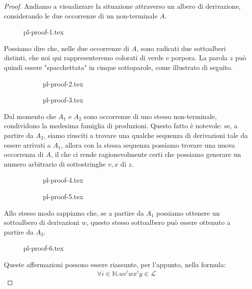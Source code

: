 \documentclass[class=book, crop=false, oneside, 12pt]{standalone}
\begin{document}
\begin{proof}
  Andiamo a visualizzare la situazione attraverso un albero di derivazione, considerando le due occorrenze di un non-terminale \(A\).
  \begin{figure}[H]
    \centering
    {pl-proof-1.tex}
  \end{figure}
  Possiamo dire che, nelle due occorrenze di \(A\), sono radicati due sottoalberi distinti, che noi qui rappresenteremo colorati di verde e porpora. La parola \(z\) può quindi essere "spacchettata" in cinque sottoparole, come illustrato di seguito.
  \begin{figure}[H]
    \centering
    \begin{subfigure}{.5\textwidth}
      \centering
      {pl-proof-2.tex}
  \end{subfigure}%
  \begin{subfigure}{.5\textwidth}
      \centering
      {pl-proof-3.tex}
  \end{subfigure}%
  \end{figure}
  Dal momento che \(A_1\) e \(A_2\) sono occorrenze di uno stesso non-terminale, condividono la medesima famiglia di produzioni. Questo fatto è notevole: se, a partire da \(A_2\), siamo riusciti a trovare una qualche sequenza di derivazioni tale da essere arrivati a \(A_1\), allora con la stessa sequenza possiamo trovare una nuova occorrenza di \(A\), il che ci rende ragionevolmente certi che possiamo generare un numero arbitrario di sottostringhe \(v, x\) di \(z\).
  \begin{figure}[H]
    \centering
    \begin{subfigure}{.5\textwidth}
      \centering
      {pl-proof-4.tex}
  \end{subfigure}%
  \begin{subfigure}{.5\textwidth}
      \centering
      {pl-proof-5.tex}
  \end{subfigure}%
  \end{figure}
  Allo stesso modo sappiamo che, se a partire da \(A_1\) possiamo ottenere un sottoalbero di derivazioni \(w\), questo stesso sottoalbero può essere ottenuto a partire da \(A_2\).
  \begin{figure}[H]
    \centering
    {pl-proof-6.tex}
  \end{figure}
  Queste affermazioni possono essere riassunte, per l'appunto, nella formula:
  \begin{equation*}
    \forall i \in \mathbb{N}.uv^iwx^iy \in \mathcal{L}

\end{equation*}
\end{proof}
\end{document}
